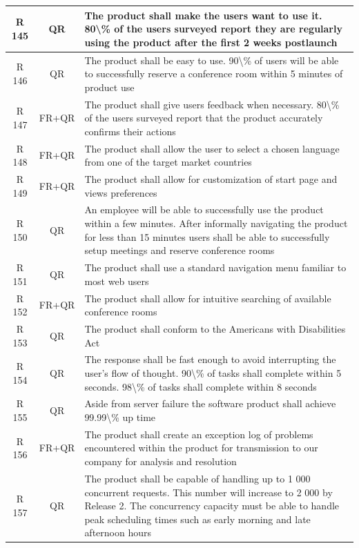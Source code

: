 \documentclass[dissertation,final]{softeng}
\begin{document}
\begin{appendices}
{\begin{center}
\begin{longtable}{c c m{}}
    R 145   & QR & The product shall make the users want to use it. 80\textbackslash{}\% of the users surveyed report they are regularly using the product after the first 2 weeks postlaunch \\    \midrule
    R 146   & QR & The product shall be easy to use. 90\textbackslash{}\% of users will be able to successfully reserve a conference room within 5 minutes of product use \\*    \midrule
    R 147   & FR+QR & The product shall give users feedback when necessary. 80\textbackslash{}\% of the users surveyed report that the product accurately confirms their actions \\    \midrule
    R 148   & FR+QR & The product shall allow the user to select a chosen language from one of the target market countries \\ \midrule
    R 149   & FR+QR & The product shall allow for customization of start page and views preferences \\    \midrule
    R 150   & QR & An employee will be able to successfully use the product within a few minutes. After informally navigating the product for less than 15 minutes users shall be able to successfully setup meetings and reserve conference rooms \\    \midrule
    R 151   & QR & The product shall use a standard navigation menu familiar to most web users \\    \midrule
    R 152   & FR+QR & The product shall allow for intuitive searching of available conference rooms \\    \midrule
    R 153   & QR & The product shall conform to the Americans with Disabilities Act \\    \midrule
    R 154   & QR & The response shall be fast enough to avoid interrupting the user's flow of thought. 90\textbackslash{}\% of tasks shall complete within 5 seconds. 98\textbackslash{}\% of tasks shall complete within 8 seconds \\    \midrule
    R 155   & QR & Aside from server failure the software product shall achieve 99.99\textbackslash{}\% up time \\    \midrule
    R 156   & FR+QR &  The product shall create an exception log of problems encountered within the product for transmission to our company for analysis and resolution \\    \midrule
    R 157   & QR & The product shall be capable of handling up to 1 000 concurrent requests. This number will increase to 2 000 by Release 2. The concurrency capacity must be able to handle peak scheduling times such as early morning and late afternoon hours \\    \midrule

\end{longtable}
\end{center}}
\end{appendices}
\end{document}
